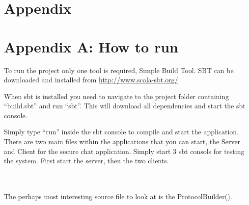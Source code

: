 \section{Appendix}
\section*{Appendix A: How to run}
To run the project only one tool is required, Simple Build Tool. SBT can be downloaded and installed from \href{http://www.scala-sbt.org/}{http://www.scala-sbt.org/}

When sbt is installed you need to navigate to the project folder containing ``build.sbt'' and run ``sbt''. This will download all dependencies and start the sbt console. 

Simply type ``run'' inside the sbt console to compile and start the application. There are two main files within the applications that you can start, the Server and Client for the secure chat application. Simply start 3 sbt consols for testing the system. First start the server, then the two clients.

\\\\
The perhaps most interesting source file to look at is the ProtocolBuilder().


